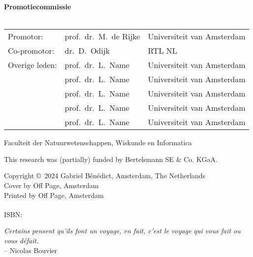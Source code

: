 {%
\clearpage
\noindent%
\textbf{Promotiecommissie} \\\\
\begin{tabular}{@{}l l l}
Promotor: 
& prof.\ dr.\ M.\ de Rijke & Universiteit van Amsterdam \\[0.5ex]  %
Co-promotor: & dr.\ D.\ Odijk & RTL NL \\[1.2ex]  %
Overige leden: 
& prof.\ dr.\ L.\ Name & Universiteit van Amsterdam \\
& prof.\ dr.\ L.\ Name & Universiteit van Amsterdam \\
& prof.\ dr.\ L.\ Name & Universiteit van Amsterdam \\
& prof.\ dr.\ L.\ Name & Universiteit van Amsterdam \\
& prof.\ dr.\ L.\ Name & Universiteit van Amsterdam 
\end{tabular}

\bigskip\noindent%
Faculteit der Natuurwetenschappen, Wiskunde en Informatica\\

\vfill

\noindent
This research was (partially) funded by Bertelsmann SE \& Co. KGaA.
\bigskip

\noindent
Copyright \copyright~2024 Gabriel Bénédict, Amsterdam, The Netherlands\\		%
Cover by Off Page, Amsterdam\\
Printed by Off Page, Amsterdam\\
\\
ISBN: \todo{}\\


\clearpage






\thispagestyle{empty}
\null\vfill
\centering
\textit{Certains pensent qu'ils font un voyage, en fait, c'est le voyage qui vous fait ou vous défait.} \\ \medskip
\qquad \qquad \qquad \qquad \qquad -- {Nicolas Bouvier}
\vfill\vfill

\clearpage




}

